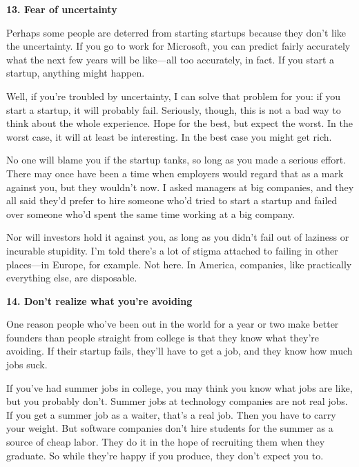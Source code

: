 \textbf{13. Fear of uncertainty}

Perhaps some people are deterred from starting
                    startups because they don't like the uncertainty. If you go
                    to work for Microsoft, you can predict fairly accurately
                    what the next few years will be like---all too
                    accurately, in fact. If you start a startup, anything might
                    happen.

Well, if you're troubled by uncertainty,
                    I can solve that problem for you: if you start a startup, it
                    will probably fail. Seriously, though, this is not a bad way
                    to think about the whole experience. Hope for the best, but
                    expect the worst. In the worst case, it will at least be
                    interesting. In the best case you might get rich.

No
                    one will blame you if the startup tanks, so long as you made
                    a serious effort. There may once have been a time when
                    employers would regard that as a mark against you, but they
                    wouldn't now. I asked managers at big companies, and they
                    all said they'd prefer to hire someone who'd tried to start
                    a startup and failed over someone who'd spent the same time
                    working at a big company.

Nor will investors hold
                    it against you, as long as you didn't fail out of laziness
                    or incurable stupidity. I'm told there's a lot of stigma
                    attached to failing in other places---in Europe, for
                    example. Not here. In America, companies, like practically
                    everything else, are disposable.

\textbf{14. Don't realize what you're avoiding}

One reason people who've been out in the world
                    for a year or two make better founders than people straight
                    from college is that they know what they're avoiding. If
                    their startup fails, they'll have to get a job, and they
                    know how much jobs suck.

If you've had summer
                    jobs in college, you may think you know what jobs are like,
                    but you probably don't. Summer jobs at technology companies
                    are not real jobs. If you get a summer job as a waiter,
                    that's a real job. Then you have to carry your weight. But
                    software companies don't hire students for the summer as a
                    source of cheap labor. They do it in the hope of recruiting
                    them when they graduate. So while they're happy if you
                    produce, they don't expect you to.

